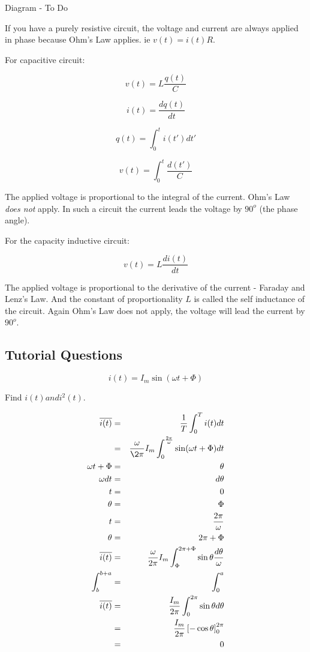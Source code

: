 \documentclass[a4paper,12pt]{article}
\begin{document}
\begin{table}[hbtp]

Diagram - To Do

\end{table}

If you have a purely resistive circuit, the voltage and
current are always applied in phase because Ohm's Law applies. ie $v(t)
= i(t) R$.

For capacitive circuit:

\[ v(t) = L \frac{q(t)}{C} \]

\[ i(t) = \frac{d q(t)}{dt} \]

\[ q(t) = \int^{t}_{0} i(t') dt' \]

\[ v(t) = \int^{t}_{0} \frac{d(t')}{C} \]

The applied voltage is proportional to the integral of the
current. Ohm's Law \emph{does not} apply. In such a circuit the current
leads the voltage by $90^{o}$ (the phase angle).

For the capacity inductive circuit:

\[ v(t) = L \frac{d i(t)}{dt} \]

The applied voltage is proportional to the derivative of the
current - Faraday and Lenz's Law. And the constant of proportionality
$L$ is called the self inductance of the circuit. Again Ohm's Law does
not apply, the voltage will lead the current by $90^{o}$.

\subsection{Tutorial Questions}

\[ i(t) = I_{m} \sin(\omega t + \Phi) \]

Find $i(t) and i^{2}(t)$.

\begin{eqnarray*}
\overline{i(t)} & = & \frac{1}{T} \int^{T}_{0} i(t) dt \\
					 & = & \frac{\omega}{\2 \pi} I_{m} \int^{\frac{2\pi}{\omega}}_{0} 
					 		 \sin(\omega t + \Phi) dt \\
\omega t + \Phi & = & \theta \\
\omega dt		 & = & d\theta \\
t					 & = & 0 \\
\theta			 & = & \Phi \\
t 					 & = & \frac{2 \pi}{\omega} \\
\theta			 & = & 2 \pi + \Phi \\
\overline{i(t)} & = & \frac{\omega}{2 \pi} I_{m} \int^{2 \pi + \Phi}_{\Phi} 
							 \sin\theta \frac{d\theta}{\omega} \\
\int^{b + a}_{b}& = & \int^{a}_{0} \\
\overline{i(t)} & = & \frac{I_{m}}{2 \pi} \int^{2 \pi}_{0} \sin\theta d\theta \\
					 & = & \frac{I_{m}}{2 \pi} \left[ - \cos\theta\right]^{2\pi}_{0} \\
					 & = & 0
\end{eqnarray*}
\end{document}
